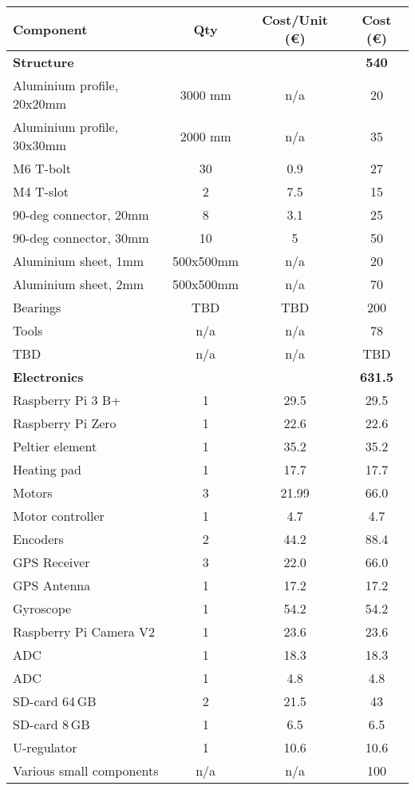\begin{table}[H]
\centering
\begin{tabular}{|l|c|c|c|} 
\hline
Component & Qty & Cost/Unit (\euro) & Cost (\euro)  \\ 
\hline
\rowcolor[HTML]{9B9B9B}
\textbf{Structure} &  &  & \textbf{540}  \\
Aluminium profile, 20x20mm & 3000 mm & n/a & 20  \\
Aluminium profile, 30x30mm & 2000 mm & n/a & 35  \\
M6 T-bolt & 30 & 0.9 & 27  \\
M4 T-slot & 2 & 7.5 & 15  \\
90-deg connector, 20mm & 8 & 3.1 & 25 \\
90-deg connector, 30mm & 10 & 5 & 50 \\
Aluminium sheet, 1mm & 500x500mm & n/a & 20 \\
Aluminium sheet, 2mm & 500x500mm & n/a & 70 \\
Bearings & TBD & TBD & 200 \\
Tools & n/a & n/a & 78 \\
TBD & n/a & n/a & TBD  \\

\rowcolor[HTML]{9B9B9B}
\textbf{Electronics} &  &  & \textbf{631.5}  \\ 
Raspberry Pi 3 B+ & 1 & 29.5 & 29.5  \\
Raspberry Pi Zero & 1 & 22.6 & 22.6  \\
Peltier element & 1 & 35.2 & 35.2  \\
Heating pad & 1 & 17.7 & 17.7  \\ 
Motors & 3 & 21.99 & 66.0  \\ 
Motor controller & 1 & 4.7 & 4.7  \\
Encoders & 2 & 44.2 & 88.4  \\
GPS Receiver & 3 & 22.0 & 66.0  \\ 
GPS Antenna & 1 & 17.2 & 17.2  \\
Gyroscope & 1 & 54.2 & 54.2  \\
Raspberry Pi Camera V2 & 1 & 23.6 & 23.6  \\ 
ADC & 1 & 18.3 & 18.3  \\ 
ADC & 1 & 4.8 & 4.8  \\
SD-card 64\,GB & 2 & 21.5 & 43  \\
SD-card 8\,GB & 1 & 6.5 & 6.5  \\
U-regulator & 1 & 10.6 & 10.6  \\
Various small components & n/a & n/a & 100  \\


\end{tabular}
\end{table}
